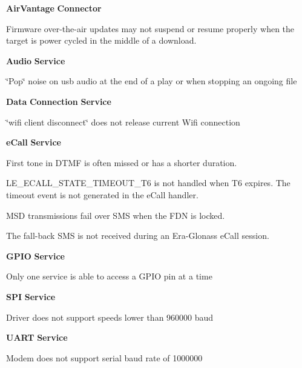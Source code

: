 {\bfseries Air\+Vantage} {\bfseries Connector} 
\begin{DoxyItemize}
\item Firmware over-\/the-\/air updates may not suspend or resume properly when the target is power cycled in the middle of a download.
\end{DoxyItemize}

{\bfseries Audio} {\bfseries Service} 
\begin{DoxyItemize}
\item \char`\"{}\+Pop\char`\"{} noise on {\ttfamily usb} audio at the end of a play or when stopping an ongoing file
\end{DoxyItemize}

{\bfseries Data} {\bfseries Connection} {\bfseries Service} 
\begin{DoxyItemize}
\item \char`\"{}wifi client disconnect\char`\"{} does not release current Wifi connection
\end{DoxyItemize}

{\bfseries e\+Call} {\bfseries Service} 
\begin{DoxyItemize}
\item First tone in D\+T\+MF is often missed or has a shorter duration.
\item {\ttfamily L\+E\+\_\+\+E\+C\+A\+L\+L\+\_\+\+S\+T\+A\+T\+E\+\_\+\+T\+I\+M\+E\+O\+U\+T\+\_\+\+T6} is not handled when T6 expires. The timeout event is not generated in the e\+Call handler.
\item M\+SD transmissions fail over S\+MS when the F\+DN is locked.
\item The fall-\/back S\+MS is not received during an Era-\/\+Glonass e\+Call session.
\end{DoxyItemize}

{\bfseries G\+P\+IO} {\bfseries Service} 
\begin{DoxyItemize}
\item Only one service is able to access a G\+P\+IO pin at a time
\end{DoxyItemize}

{\bfseries S\+PI} {\bfseries Service} 
\begin{DoxyItemize}
\item Driver does not support speeds lower than 960000 baud
\end{DoxyItemize}

{\bfseries U\+A\+RT} {\bfseries Service} 
\begin{DoxyItemize}
\item Modem does not support serial baud rate of 1000000
\end{DoxyItemize}

